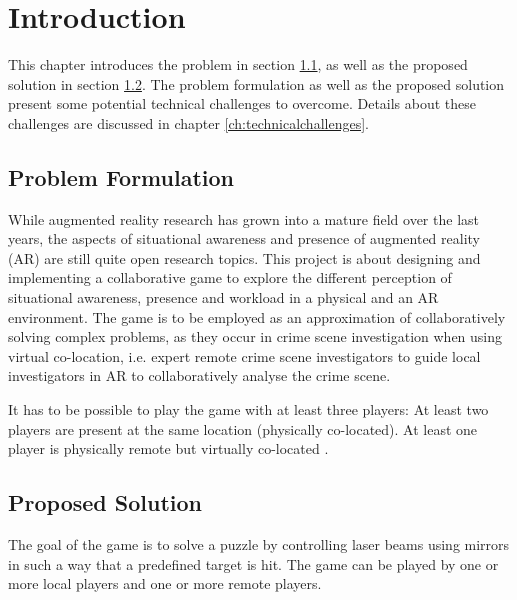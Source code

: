 \chapter{Introduction} \label{ch:introduction}
	This chapter introduces the problem in section \ref{sec:problem}, as well as
	the proposed solution in section \ref{sec:solution}. The problem formulation
	as well as the proposed solution present some potential technical challenges 
	to overcome. Details about these challenges are discussed in chapter 
	\ref{ch:technicalchallenges}.

	\section{Problem Formulation} \label{sec:problem}
		While augmented reality research has grown into a mature field over the 
		last years, the aspects of situational awareness and presence of 
		augmented reality (AR) are still quite open research topics. This 
		project is about designing and implementing a collaborative game to 
		explore the different perception of situational awareness, presence and 
		workload in a physical and an AR environment. The game is to be employed 
		as an approximation of collaboratively solving complex problems, as they 
		occur in crime scene investigation when using virtual co-location, i.e. 
		expert remote crime scene investigators to guide local investigators in 
		AR to collaboratively analyse the crime scene. 
		
		It has to be possible to play the game with at least three players: At 
		least two players are present at the same location (physically 
		co-located). At least one player is physically remote but virtually 
		co-located \cite{bepsys}.
	
	\section{Proposed Solution} \label{sec:solution}
		The goal of the game is to solve a puzzle by controlling laser beams 
		using mirrors in such a way that a predefined target is hit. The game 
		can be played by one or more local players and one or more remote players.
		
